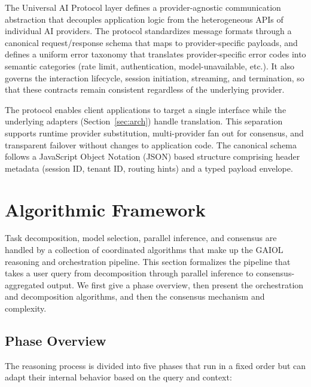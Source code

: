 \documentclass{iopjournal}
\begin{document}
The Universal AI Protocol layer defines a provider-agnostic communication abstraction that decouples application logic from the heterogeneous APIs of individual AI providers. The protocol standardizes message formats through a canonical request/response schema that maps to provider-specific payloads, and defines a uniform error taxonomy that translates provider-specific error codes into semantic categories (rate limit, authentication, model-unavailable, etc.). It also governs the interaction lifecycle, session initiation, streaming, and termination, so that these contracts remain consistent regardless of the underlying provider.

The protocol enables client applications to target a single interface while the underlying adapters (Section~\ref{sec:arch}) handle translation. This separation supports runtime provider substitution, multi-provider fan out for consensus, and transparent failover without changes to application code. The canonical schema follows a JavaScript Object Notation (JSON) based structure comprising header metadata (session ID, tenant ID, routing hints) and a typed payload envelope.

\section{Algorithmic Framework}
\label{sec:algo}

Task decomposition, model selection, parallel inference, and consensus are handled by a collection of coordinated algorithms that make up the GAIOL reasoning and orchestration pipeline. This section formalizes the pipeline that takes a user query from decomposition through parallel inference to consensus-aggregated output. We first give a phase overview, then present the orchestration and decomposition algorithms, and then the consensus mechanism and complexity.

\subsection{Phase Overview}

The reasoning process is divided into five phases that run in a fixed order but can adapt their internal behavior based on the query and context:
\end{document}
